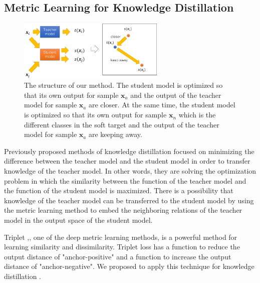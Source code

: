 \documentclass[twocolumn,10pt]{article}
\begin{document}
\thispagestyle{empty}
\subsection{Metric Learning for Knowledge Distillation}
\begin{figure}[h!]
\begin{center}
\includegraphics[width=70mm]{figure_ours.png}
\caption{The structure of our method. The student model is optimized so that its own output for sample $\bm{x}_a$ and the output of the teacher model for sample $\bm{x}_a$ are closer. At the same time, the student model is optimized so that its own output for sample $\bm{x}_n$ which is the different classes in the soft target and the output of the teacher model for sample $\bm{x}_a$ are keeping away.}
\label{fig:ours}
\end{center}
\end{figure}

Previously proposed methods of knowledge distillation focused on minimizing the difference between the teacher model and the student model in order to transfer knowledge of the teacher model.
In other words, they are solving the optimization problem in which the similarity between the function of the teacher model and the function of the student model is maximized.
There is a possibility that knowledge of the teacher model can be transferred to the student model by using the metric learning method to embed the neighboring relations of the teacher model in the output space of the student model.

Triplet \cite{Wang2014},\cite{Hoffer2015}, one of the deep metric learning methods, is a powerful method for learning similarity and dissimilarity.
Triplet loss has a function to reduce the output distance of "anchor-positive" and a function to increase the output distance of "anchor-negative".
We proposed to apply this technique for knowledge distillation \cite{Oki2020}.
\end{document}

